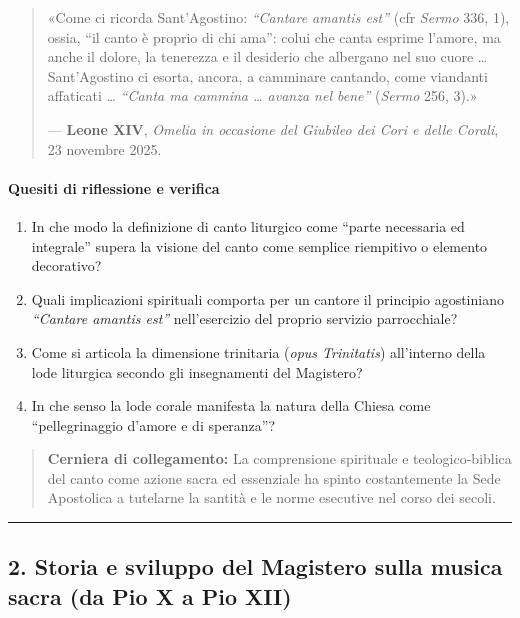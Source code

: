 \documentclass[12pt,a4paper]{article}
\begin{document}
	\begin{quote}
		«Come ci ricorda Sant'Agostino: \emph{``Cantare amantis est''} (cfr \emph{Sermo} 336, 1), ossia, ``il canto è proprio di chi ama'': colui che canta esprime l'amore, ma anche il dolore, la tenerezza e il desiderio che albergano nel suo cuore \ldots{} Sant'Agostino ci esorta, ancora, a camminare cantando, come viandanti affaticati \ldots{} \emph{``Canta ma cammina \ldots{} avanza nel bene''} (\emph{Sermo} 256, 3).»
		
		--- \textbf{Leone XIV}, \emph{Omelia in occasione del Giubileo dei Cori e delle Corali}, 23 novembre 2025.
	\end{quote}
	
	\paragraph{Quesiti di riflessione e verifica}\label{quesiti-di-riflessione-e-verifica}
	
	\begin{enumerate}[label=\arabic*.,leftmargin=*]
		\item In che modo la definizione di canto liturgico come ``parte necessaria ed integrale'' supera la visione del canto come semplice riempitivo o elemento decorativo?
		\item Quali implicazioni spirituali comporta per un cantore il principio agostiniano \emph{``Cantare amantis est''} nell'esercizio del proprio servizio parrocchiale?
		\item Come si articola la dimensione trinitaria (\emph{opus Trinitatis}) all'interno della lode liturgica secondo gli insegnamenti del Magistero?
		\item In che senso la lode corale manifesta la natura della Chiesa come ``pellegrinaggio d'amore e di speranza''?
	\end{enumerate}
	
	\begin{quote}
		\textbf{Cerniera di collegamento:} La comprensione spirituale e teologico-biblica del canto come azione sacra ed essenziale ha spinto costantemente la Sede Apostolica a tutelarne la santità e le norme esecutive nel corso dei secoli.
	\end{quote}
	
	\begin{center}\rule{0.5\linewidth}{0.5pt}\end{center}
	
	\subsection{2. Storia e sviluppo del Magistero sulla musica sacra (da Pio X a Pio XII)}\label{storia-e-sviluppo-del-magistero-sulla-musica-sacra-da-pio-x-a-pio-xii}
	
\end{document}
